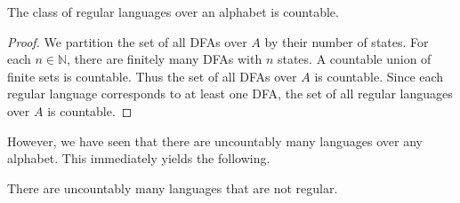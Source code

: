 \begin{theorem}
    The class of regular languages over an alphabet is countable.
\end{theorem}
\begin{proof}
    We partition the set of all DFAs over $A$ by their number of states.
    For each $n \in \mathbb{N}$, there are finitely many DFAs with $n$
    states.
    A countable union of finite sets is countable.
    Thus the set of all DFAs over $A$ is countable.
    Since each regular language corresponds to at least one DFA, the set
    of all regular languages over $A$ is countable.
\end{proof}
However, we have seen that there are uncountably many languages over any
alphabet.
This immediately yields the following.
\begin{corollary}
    There are uncountably many languages that are not regular.
\end{corollary}

